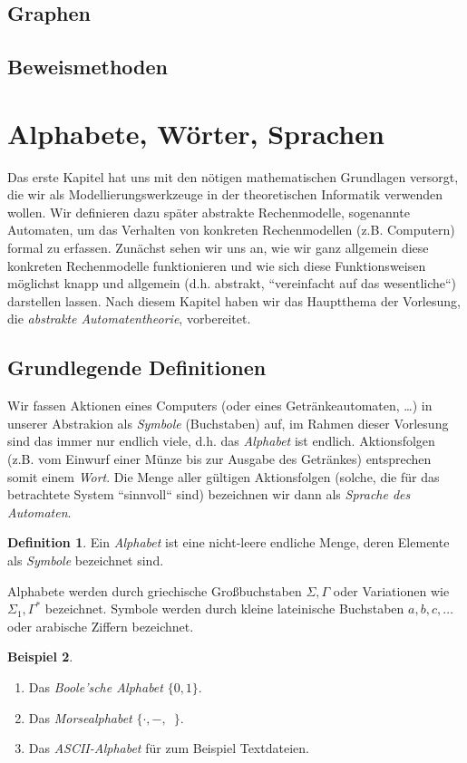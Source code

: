 \documentclass[11pt, a4paper]{article}
\theoremstyle{definition}
\newtheorem{definition}{Definition}[section]
\newtheorem{example}[definition]{Beispiel}
\theoremstyle{plain}
\numberwithin{equation}{section}
\begin{document}
\subsection{Graphen}\label{sec:pre_graphs}

\subsection{Beweismethoden}\label{sec:pre_proofs}



\newpage
\section{Alphabete, Wörter, Sprachen}\label{sec:awl}
Das erste Kapitel hat uns mit den nötigen mathematischen Grundlagen versorgt, die wir als Modellierungswerkzeuge in der theoretischen Informatik verwenden wollen. Wir definieren dazu später abstrakte Rechenmodelle, sogenannte Automaten, um das Verhalten von konkreten Rechenmodellen (z.B. Computern) formal zu erfassen. Zunächst sehen wir uns an, wie wir ganz allgemein diese konkreten Rechenmodelle funktionieren und wie sich diese Funktionsweisen möglichst knapp und allgemein (d.h. abstrakt, ``vereinfacht auf das wesentliche``) darstellen lassen. Nach diesem Kapitel haben wir das Hauptthema der Vorlesung, die \textit{abstrakte Automatentheorie}, vorbereitet.

\subsection{Grundlegende Definitionen}\label{sec:awl_def}
Wir fassen Aktionen eines Computers (oder eines Getränkeautomaten, \ldots) in unserer Abstrakion als \textit{Symbole} (Buchstaben) auf, im Rahmen dieser Vorlesung sind das immer nur endlich viele, d.h. das \textit{Alphabet} ist endlich. Aktionsfolgen (z.B. vom Einwurf einer Münze bis zur Ausgabe des Getränkes) entsprechen somit einem \textit{Wort}. Die Menge aller gültigen Aktionsfolgen (solche, die für das betrachtete System ``sinnvoll`` sind) bezeichnen wir dann als \textit{Sprache des Automaten}.
\begin{definition}
	Ein \textit{Alphabet} ist eine nicht-leere endliche Menge, deren Elemente als \textit{Symbole} bezeichnet sind.
\end{definition}
Alphabete werden durch griechische Großbuchstaben \( \Sigma, \Gamma \) oder Variationen wie \( \Sigma_1, \Gamma^\ast \) bezeichnet. Symbole werden durch kleine lateinische Buchstaben \( a, b, c, \ldots \) oder arabische Ziffern bezeichnet.
\begin{example}
	\
	\begin{enumerate}
		\item Das \textit{Boole'sche Alphabet} \( \{ 0, 1 \} \).
		\item Das \textit{Morsealphabet} \( \{ \cdot, -, \,\,\, \} \).
		\item Das \textit{ASCII-Alphabet} für zum Beispiel Textdateien.
	\end{enumerate}
\end{example}
\end{document}
